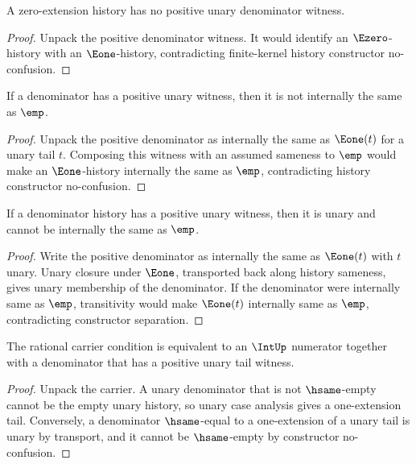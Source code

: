 \begin{theorem}
\label{thm:rat-positive-denominator-e0-absurd}
A zero-extension history has no positive unary denominator witness.
\end{theorem}
\begin{proof}
Unpack the positive denominator witness. It would identify an
\(\Ezero\)-history with an \(\Eone\)-history, contradicting finite-kernel
history constructor no-confusion.
\end{proof}

\begin{theorem}
\label{thm:rat-positive-unary-denominator-not-empty}
If a denominator has a positive unary witness, then it is not internally the
same as \(\emp\).
\end{theorem}
\begin{proof}
Unpack the positive denominator as internally the same as \(\Eone(t)\) for a
unary tail \(t\). Composing this witness with an assumed sameness to \(\emp\)
would make an \(\Eone\)-history internally the same as \(\emp\), contradicting
history constructor no-confusion.
\end{proof}

\begin{theorem}
\label{thm:positive-unary-denominator-unary-and-nonempty}
If a denominator history has a positive unary witness, then it is unary and cannot be internally the same as \(\emp\).
\end{theorem}
\begin{proof}
Write the positive denominator as internally the same as \(\Eone(t)\) with \(t\) unary. Unary closure under \(\Eone\), transported back along history sameness, gives unary membership of the denominator. If the denominator were internally same as \(\emp\), transitivity would make \(\Eone(t)\) internally same as \(\emp\), contradicting constructor separation.
\end{proof}

\begin{theorem}
\label{thm:rat-carrier-iff-positive-unary-denominator}
The rational carrier condition is equivalent to an $\IntUp$ numerator together with a denominator that has a positive unary tail witness.
\end{theorem}
\begin{proof}
Unpack the carrier. A unary denominator that is not $\hsame$-empty cannot be the empty unary history, so unary case analysis gives a one-extension tail. Conversely, a denominator $\hsame$-equal to a one-extension of a unary tail is unary by transport, and it cannot be $\hsame$-empty by constructor no-confusion.
\end{proof}

